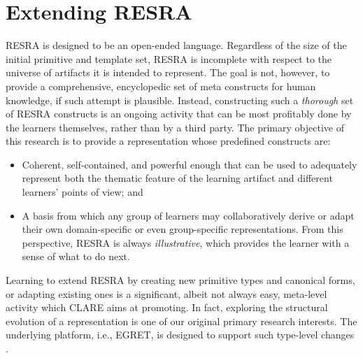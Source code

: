 \section{Extending RESRA}
\label{sec:extensions}

RESRA is designed to be an open-ended language. Regardless of the size of
the initial primitive and template set, RESRA is incomplete with respect to
the universe of artifacts it is intended to represent. The goal is not,
however, to provide a comprehensive, encyclopedic set of meta constructs
for human knowledge, if such attempt is plausible.  Instead, constructing
such a {\it thorough\/} set of RESRA constructs is an ongoing activity that
can be most profitably done by the learners themselves, rather than by a
third party. The primary objective of this research is to provide a
representation whose predefined constructs are:

\begin{itemize}
\item Coherent, self-contained, and powerful enough that can be used to
  adequately represent both the thematic feature of the learning artifact
  and different learners' points of view; and
  
\item A basis from which any group of learners may collaboratively derive
  or adapt their own domain-specific or even group-specific
  representations.  From this perspective, RESRA is always {\it
  illustrative\/}, which provides the learner with a sense of what to do
  next.
\end{itemize}

Learning to extend RESRA by creating new primitive types and canonical
forms, or adapting existing ones is a significant, albeit not always easy,
meta-level activity which CLARE aims at promoting. In fact, exploring the
structural evolution of a representation is one of our original primary
research interests.  The underlying platform, i.e., EGRET, is designed to
support such type-level changes \cite{csdl-91-03}.









